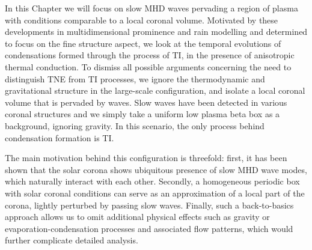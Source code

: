 In this Chapter we will focus on slow MHD waves pervading a region of plasma with conditions comparable to a local coronal volume. Motivated by these developments in multidimensional prominence and rain modelling and determined to focus on the fine structure aspect, we look at the temporal evolutions of condensations formed through the process of TI, in the presence of anisotropic thermal conduction. To dismiss all possible arguments concerning the need to distinguish TNE from TI processes, we ignore the thermodynamic and gravitational structure in the large-scale configuration, and isolate a local coronal volume that is pervaded by waves. Slow waves have been detected in various coronal structures \citep{roberts2006,demoortel2015} and we simply take a uniform low plasma beta box as a background, ignoring gravity. In this scenario, the only process behind condensation formation is TI.

The main motivation behind this configuration is threefold: first, it has been shown that the solar corona shows ubiquitous presence of slow MHD wave modes, which naturally interact with each other. Secondly, a homogeneous periodic box with solar coronal conditions can serve as an approximation of a local part of the corona, lightly perturbed by passing slow waves. Finally, such a back-to-basics approach allows us to omit additional physical effects such as gravity or evaporation-condensation processes and associated flow patterns, which would further complicate detailed analysis.

